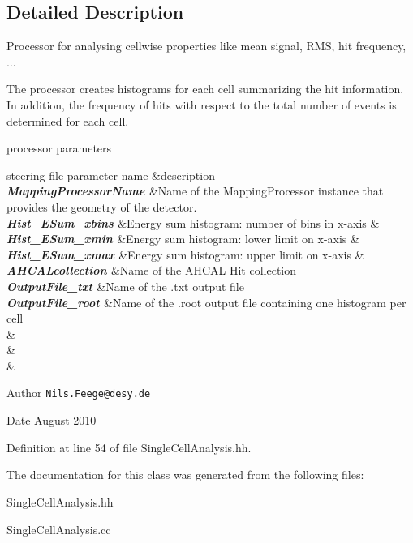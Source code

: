 \subsection{Detailed Description}
Processor for analysing cellwise properties like mean signal, R\-M\-S, hit frequency, ... 

The processor creates histograms for each cell summarizing the hit information. In addition, the frequency of hits with respect to the total number of events is determined for each cell.

\begin{DoxyParagraph}{processor parameters}
\begin{TabularC}{3}
\hline
steering file parameter name &description  \\
{\bfseries {\itshape  Mapping\-Processor\-Name }}&Name of the Mapping\-Processor instance that provides the geometry of the detector.  \\
{\bfseries {\itshape  Hist\-\_\-\-E\-Sum\-\_\-xbins }}&Energy sum histogram\-: number of bins in x-\/axis &\\
{\bfseries {\itshape  Hist\-\_\-\-E\-Sum\-\_\-xmin }}&Energy sum histogram\-: lower limit on x-\/axis &\\
{\bfseries {\itshape  Hist\-\_\-\-E\-Sum\-\_\-xmax }}&Energy sum histogram\-: upper limit on x-\/axis &\\
{\bfseries {\itshape  A\-H\-C\-A\-Lcollection }}&Name of the A\-H\-C\-A\-L Hit collection  \\
{\bfseries {\itshape  Output\-File\-\_\-txt }}&Name of the .txt output file  \\
{\bfseries {\itshape  Output\-File\-\_\-root }}&Name of the .root output file containing one histogram per cell  \\
{\bfseries {\itshape  }}&\\
{\bfseries {\itshape  }}&\\
{\bfseries {\itshape  }}&\\
\end{TabularC}

\end{DoxyParagraph}
\begin{DoxyAuthor}{Author}
{\tt Nils.\-Feege@desy.\-de} 
\end{DoxyAuthor}
\begin{DoxyDate}{Date}
August 2010 
\end{DoxyDate}


Definition at line 54 of file Single\-Cell\-Analysis.\-hh.



The documentation for this class was generated from the following files\-:\begin{DoxyCompactItemize}
\item 
Single\-Cell\-Analysis.\-hh\item 
Single\-Cell\-Analysis.\-cc\end{DoxyCompactItemize}
